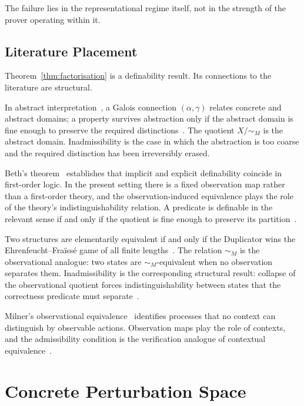 \documentclass[12pt]{article}
\theoremstyle{plain}
\theoremstyle{definition}
\theoremstyle{remark}
\begin{document}
The failure lies in the representational regime itself, not in the
strength of the prover operating within it.

\subsection{Literature Placement}
\label{subsec:literature}

Theorem~\ref{thm:factorisation} is a definability result.
Its connections to the literature are structural.

In abstract interpretation~\cite{cousot1977,cousot1979}, a Galois
connection $(\alpha,\gamma)$ relates concrete and abstract domains;
a property survives abstraction only if the abstract domain is fine
enough to preserve the required distinctions~\cite{cousot2002,giacobazzi1998}.
The quotient $X/{\sim_M}$ is the abstract domain.
Inadmissibility is the case in which the abstraction is too coarse
and the required distinction has been irreversibly erased.

Beth's theorem~\cite{beth1953} establishes that implicit and explicit
definability coincide in first-order logic.
In the present setting there is a fixed observation map rather than a
first-order theory, and the observation-induced equivalence plays the
role of the theory's indistinguishability relation.
A predicate is definable in the relevant sense if and only if the
quotient is fine enough to preserve its partition~\cite{hodges1993}.

Two structures are elementarily equivalent if and only if the
Duplicator wins the Ehrenfeucht--Fra\"{i}ss\'{e} game of all finite
lengths~\cite{ehrenfeucht1961,fraisse1954}.
The relation $\sim_M$ is the observational analogue: two states are
$\sim_M$-equivalent when no observation separates them.
Inadmissibility is the corresponding structural result: collapse of
the observational quotient forces indistinguishability between states
that the correctness predicate must separate~\cite{libkin2004}.

Milner's observational equivalence~\cite{milner1980,milner1989}
identifies processes that no context can distinguish by observable
actions.
Observation maps play the role of contexts, and the admissibility
condition is the verification analogue of contextual
equivalence~\cite{sangiorgi2011}.

\section{Concrete Perturbation Space}
\label{sec:perturbations}
\end{document}
